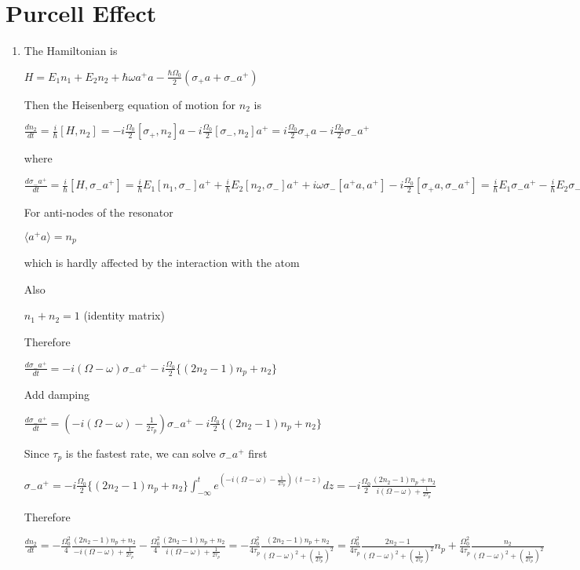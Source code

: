 \documentclass{article}
\begin{document}
    \section{Purcell Effect}\label{purcell-effect}
\begin{enumerate}
\def\labelenumi{\arabic{enumi}.}
  \item The Hamiltonian is

$H=E_1 n_1 + E_2 n_2 + \hbar \omega a^+a - \frac{\hbar \Omega_0}{2}  (\sigma_+ a + \sigma_- a^+)$

Then the Heisenberg equation of motion for $n_2$ is

$\frac{d n_2}{dt} = \frac{i}{\hbar} [H, n_2] = -i \frac{\Omega_0}{2}[\sigma_+  , n_2]a-i \frac{\Omega_0}{2}[\sigma_- , n_2]a^+ = i \frac{\Omega_0}{2}\sigma_+ a -i \frac{\Omega_0}{2} \sigma_- a^+$

where

$\frac{d \sigma_- a^+}{dt} = \frac{i}{\hbar} [H, \sigma_- a^+] =\frac{i}{\hbar}E_1[n_1, \sigma_- ]a^++\frac{i}{\hbar} E_2[n_2, \sigma_- ]a^+ +i\omega \sigma_-[a^+a,  a^+]-i \frac{\Omega_0}{2}[\sigma_+ a ,\sigma_- a^+] =\frac{i}{\hbar}E_1 \sigma_- a^+ - \frac{i}{\hbar} E_2\sigma_-a^+ +i\omega \sigma_- a^+-i \frac{\Omega_0}{2}\{(n_2-n_1)a^+ a + n_2\} = -i(\Omega-\omega)\sigma_- a^+  -i \frac{\Omega_0}{2}\{(n_2-n_1)a^+ a + n_2\}$

For anti-nodes of the resonator

$\langle a^+ a\rangle = n_p$

which is hardly affected by the interaction with the atom

Also

$n_1+n_2 =1$ (identity matrix)

Therefore

$\frac{d \sigma_- a^+}{dt} = -i(\Omega-\omega)\sigma_- a^+  -i \frac{\Omega_0}{2} \{(2n_2-1)n_p + n_2\}$

Add damping

$\frac{d \sigma_- a^+}{dt} = (-i(\Omega-\omega)-\frac{1}{2\tau_p})\sigma_- a^+  -i \frac{\Omega_0}{2} \{(2n_2-1)n_p + n_2\}$

Since $\tau_p$ is the fastest rate, we can solve $\sigma_- a^+$ first

$\sigma_- a^+ = -i \frac{\Omega_0}{2} \{(2n_2-1)n_p + n_2\} \int_{-\infty}^t e^{(-i(\Omega-\omega)-\frac{1}{2\tau_p})(t-z)}dz =-i \frac{\Omega_0}{2} \frac{(2n_2-1)n_p + n_2}{i(\Omega-\omega)+\frac{1}{2\tau_p}} $

Therefore

$\frac{d n_2}{dt} = - \frac{\Omega_0^2}{4}\frac{(2n_2-1)n_p + n_2}{-i(\Omega-\omega)+\frac{1}{2\tau_p}}- \frac{\Omega_0^2}{4} \frac{(2n_2-1)n_p + n_2}{i(\Omega-\omega)+\frac{1}{2\tau_p}} = - \frac{\Omega_0^2}{4 \tau_p}\frac{(2n_2-1)n_p + n_2}{(\Omega-\omega)^2+(\frac{1}{2\tau_p})^2} =  \frac{\Omega_0^2}{4 \tau_p}\frac{2n_2-1}{(\Omega-\omega)^2+(\frac{1}{2\tau_p})^2} n_p +\frac{\Omega_0^2}{4 \tau_p}\frac{n_2}{(\Omega-\omega)^2+(\frac{1}{2\tau_p})^2}$


\end{enumerate}
\end{document}
